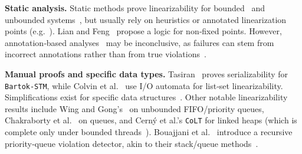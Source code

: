 

\medskip
\noindent
\textbf{Static analysis.}
Static methods prove linearizability for bounded~\cite{AmRiReSaYa07,MaLeSaRaBe08} and unbounded systems~\cite{BeLeMaRaSa08,Va09,Va10}, but usually rely on heuristics or annotated linearization points (e.g.~\cite{DrPe14}).  
	Lian and Feng~\cite{LiFe13} propose a logic for non‐fixed points.  
	However, annotation‐based analyses~\cite{OhRiVeYaYo10,ZhPeHa15,AbJoTr16} may be inconclusive, as failures can stem from incorrect annotations rather than from true violations~\cite{BoEmCoHa15}.

\medskip
\noindent
\textbf{Manual proofs and specific data types.}
Tasiran~\cite{Ta08} proves serializability for \texttt{Bartok-STM}, while Colvin et al.~\cite{CoGrLuMo06} use I/O automata for list‐set linearizability.  
	Simplifications exist for specific data structures~\cite{BoEmEnMu17,FeEnMoRiSh18}.
	Other notable linearizability results include Wing and Gong's~\cite{WiGo93} on unbounded FIFO/priority queues, Chakraborty et al.~\cite{ChHeSeVa15} on queues, and Cerný et al.’s \texttt{CoLT} for linked heaps (which is complete only under bounded threads~\cite{CeRaZuChAl10}).  
	Bouajjani et al.~\cite{BoEnWa17} introduce a recursive priority‐queue violation detector, akin to their stack/queue methods~\cite{BoEmEnHa18}.

